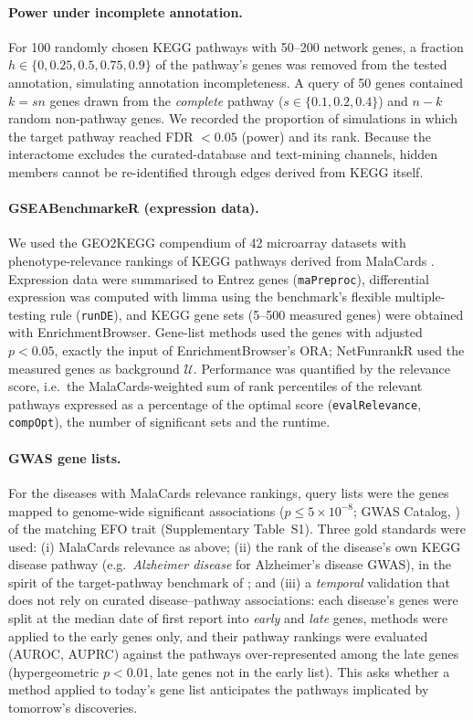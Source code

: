 \paragraph{Power under incomplete annotation.}
For 100 randomly chosen KEGG pathways with 50--200 network genes, a fraction $h \in \{0, 0.25, 0.5, 0.75, 0.9\}$ of the pathway's genes was removed from the tested annotation, simulating annotation incompleteness. A query of 50 genes contained $k = sn$ genes drawn from the \emph{complete} pathway ($s \in \{0.1, 0.2, 0.4\}$) and $n - k$ random non-pathway genes. We recorded the proportion of simulations in which the target pathway reached FDR $< 0.05$ (power) and its rank. Because the interactome excludes the curated-database and text-mining channels, hidden members cannot be re-identified through edges derived from KEGG itself.

\paragraph{GSEABenchmarkeR (expression data).}
We used the GEO2KEGG compendium of 42 microarray datasets with phenotype-relevance rankings of KEGG pathways derived from MalaCards \citep{Geistlinger2021}. Expression data were summarised to Entrez genes (\texttt{maPreproc}), differential expression was computed with limma using the benchmark's flexible multiple-testing rule (\texttt{runDE}), and KEGG gene sets (5--500 measured genes) were obtained with EnrichmentBrowser. Gene-list methods used the genes with adjusted $p < 0.05$, exactly the input of EnrichmentBrowser's ORA; NetFunrankR used the measured genes as background $\mathcal{U}$. Performance was quantified by the relevance score, i.e.\ the MalaCards-weighted sum of rank percentiles of the relevant pathways expressed as a percentage of the optimal score (\texttt{evalRelevance}, \texttt{compOpt}), the number of significant sets and the runtime.

\paragraph{GWAS gene lists.}
For the diseases with MalaCards relevance rankings, query lists were the genes mapped to genome-wide significant associations ($p \le 5\times10^{-8}$; GWAS Catalog, \citealp{Sollis2023}) of the matching EFO trait (Supplementary Table~S1). Three gold standards were used: (i) MalaCards relevance as above; (ii) the rank of the disease's own KEGG disease pathway (e.g.\ \textit{Alzheimer disease} for Alzheimer's disease GWAS), in the spirit of the target-pathway benchmark of \citet{Tarca2012}; and (iii) a \emph{temporal} validation that does not rely on curated disease--pathway associations: each disease's genes were split at the median date of first report into \emph{early} and \emph{late} genes, methods were applied to the early genes only, and their pathway rankings were evaluated (AUROC, AUPRC) against the pathways over-represented among the late genes (hypergeometric $p < 0.01$, late genes not in the early list). This asks whether a method applied to today's gene list anticipates the pathways implicated by tomorrow's discoveries.

